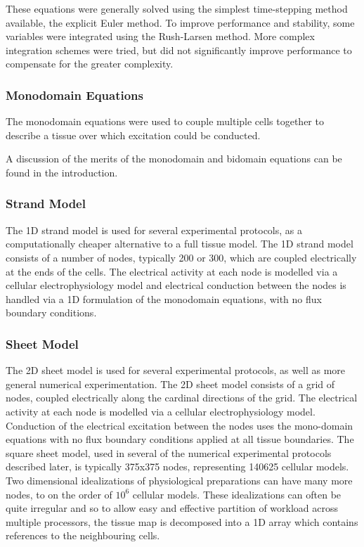 These equations were generally solved using the simplest time-stepping method
available, the explicit Euler method.  To improve performance and stability,
some variables were integrated using the Rush-Larsen method.  More complex
integration schemes were tried, but did not significantly improve performance to
compensate for the greater complexity.

\subsubsection{Monodomain Equations}

The monodomain equations were used to couple multiple cells together to describe
a tissue over which excitation could be conducted.


A discussion of the merits of the monodomain and bidomain equations can be found
in the introduction.


\subsubsection{Strand Model}

The 1D strand model is used for several experimental protocols, as
a computationally cheaper alternative to a full tissue model.  The 1D strand
model consists of a number of nodes, typically 200 or 300, which are coupled
electrically at the ends of the cells.  The electrical activity at each node is
modelled via a cellular electrophysiology model and electrical conduction between the
nodes is handled via a 1D formulation of the monodomain equations, with no
flux boundary conditions.

\subsubsection{Sheet Model}

The 2D sheet model is used for several experimental protocols, as well as more
general numerical experimentation.  The 2D sheet model consists of a grid of
nodes, coupled electrically along the cardinal directions of the grid.  The
electrical activity at each node is modelled via a cellular electrophysiology
model.  Conduction of the electrical excitation between the nodes uses the
mono-domain equations with no flux boundary conditions applied at all tissue
boundaries.  The square sheet model, used in several of the numerical
experimental protocols described later, is typically 375x375 nodes, representing
140625 cellular models.  Two dimensional idealizations of physiological
preparations can have many more nodes, to on the order of $10^{6}$ cellular
models.  These idealizations can often be quite irregular and so to allow easy
and effective partition of workload across multiple processors, the tissue map
is decomposed into a 1D array which contains references to the neighbouring
cells.


